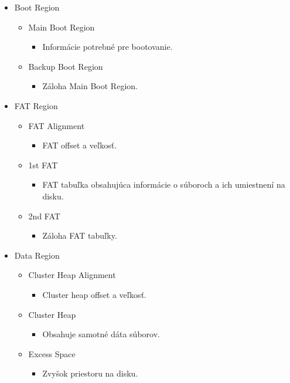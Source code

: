 \documentclass[12pt,oneside,slovak,a4paper]{article}
\begin{document}
\begin{spacing}{1.0}
\begin{itemize}
	\item Boot Region
		\begin{itemize}
			\item Main Boot Region
			\begin{itemize}
				\item Informácie potrebné pre bootovanie.
			\end{itemize}
		\item Backup Boot Region
			\begin{itemize}
				\item Záloha Main Boot Region.
			\end{itemize}
		\end{itemize}

	\item FAT Region
		\begin{itemize}
			\item FAT Alignment
				\begin{itemize}
					\item FAT offset a veľkosť.
				\end{itemize}
			\item 1st FAT
				\begin{itemize}
					\item FAT tabuľka obsahujúca informácie o súboroch a ich umiestnení na disku.
				\end{itemize}
			\item 2nd FAT
				\begin{itemize}
					\item Záloha FAT tabuľky.
				\end{itemize}
		\end{itemize}

	\item Data Region
		\begin{itemize}
			\item Cluster Heap Alignment
				\begin{itemize}
					\item Cluster heap offset a veľkosť.
				\end{itemize}
			\item Cluster Heap
				\begin{itemize}
					\item Obsahuje samotné dáta súborov.
				\end{itemize}
			\item Excess Space
				\begin{itemize}
					\item Zvyšok priestoru na disku.
				\end{itemize}
		\end{itemize}
\end{itemize}
\end{spacing}
\end{document}
